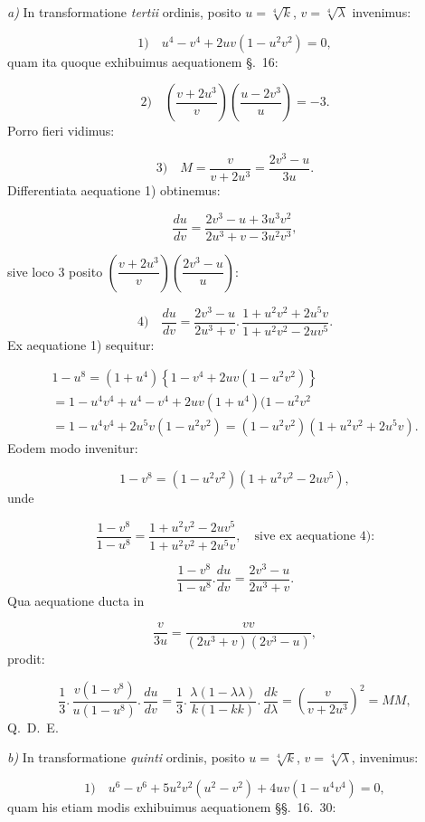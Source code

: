 \documentclass{article}
\begin{document}
\emph{a)} In transformatione \emph{tertii} ordinis, posito $u=\sqrt[4]{k}$, $v=\sqrt[4]{\lambda}$ invenimus:

\[
\text{1)}\quad u^{4}-v^{4}+2uv(1-u^{2}v^{2})=0,
\]
quam ita quoque exhibuimus aequationem §.\ 16:

\[
\text{2)}\quad\left(\frac{v+2u^{3}}{v}\right)\left(\frac{u-2v^{3}}{u}\right)=-3.
\]
Porro fieri vidimus:

\[
\text{3)}\quad M=\frac{v}{v+2u^{3}}=\frac{2v^{3}-u}{3u}.
\]
Differentiata aequatione 1) obtinemus:

\[
\frac{du}{dv}=\frac{2v^{3}-u+3u^{3}v^{2}}{2u^{3}+v-3u^{2}v^{3}},
\]

sive loco $3$ posito $\left(\dfrac{v+2u^{3}}{v}\right)\left(\dfrac{2v^{3}-u}{u}\right)$:

\[
\text{4)}\quad\frac{du}{dv}=\frac{2v^{3}-u}{2u^{3}+v}.\,\frac{1+u^{2}v^{2}+2u^{5}v}{1+u^{2}v^{2}-2uv^{5}}.
\]
Ex aequatione 1) sequitur:

\[
\begin{gathered}
1-u^{8}=(1+u^{4})\left\{1-v^{4}+2uv(1-u^{2}v^{2})\right\}\\[1ex]
=1-u^{4}v^{4}+u^{4}-v^{4}+2uv(1+u^{4})(1-u^{2}v^{2}\\[1ex]
=1-u^{4}v^{4}+2u^{5}v(1-u^{2}v^{2})=(1-u^{2}v^{2})(1+u^{2}v^{2}+2u^{5}v).
\end{gathered}
\]
Eodem modo invenitur:

\[
1-v^{8}=(1-u^{2}v^{2})(1+u^{2}v^{2}-2uv^{5}),
\]
unde

\[
\frac{1-v^{8}}{1-u^{8}}=\frac{1+u^{2}v^{2}-2uv^{5}}{1+u^{2}v^{2}+2u^{5}v},\quad\text{sive ex aequatione 4):}
\]

\[
\frac{1-v^{8}}{1-u^{8}}.\frac{du}{dv}=\frac{2v^{3}-u}{2u^{3}+v}.
\]
Qua aequatione ducta in

\[
\frac{v}{3u}=\frac{vv}{(2u^{3}+v)(2v^{3}-u)},
\]
prodit:

\[
\frac{1}{3}.\,\frac{v(1-v^{8})}{u(1-u^{8})}.\,\frac{du}{dv}=\frac{1}{3}.\,\frac{\lambda(1-\lambda\lambda)}{k(1-kk)}.\,\frac{dk}{d\lambda}=\left(\frac{v}{v+2u^{3}}\right)^{2}=MM,
\]
Q.\ D.\ E.

\emph{b)} In transformatione \emph{quinti} ordinis, posito $u=\sqrt[4]{k}$, $v=\sqrt[4]{\lambda}$, invenimus:

\[
\text{1)}\quad u^{6}-v^{6}+5u^{2}v^{2}(u^{2}-v^{2})+4uv(1-u^{4}v^{4})=0,
\]
quam his etiam modis exhibuimus aequationem §§.\ 16.\ 30:
\end{document}
